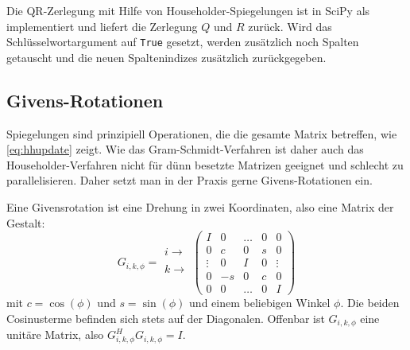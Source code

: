 Die QR-Zerlegung mit Hilfe von Householder-Spiegelungen ist in SciPy
als  implementiert und liefert die Zerlegung
$Q$ und $R$ zurück. Wird das Schlüsselwortargument  auf
\texttt{True} gesetzt, werden zusätzlich noch Spalten getauscht und
die neuen Spaltenindizes zusätzlich zurückgegeben.

\subsection{Givens-Rotationen}

Spiegelungen sind prinzipiell Operationen, die die gesamte Matrix
betreffen, wie \eqref{eq:hhupdate} zeigt. Wie das
Gram-Schmidt-Verfahren ist daher auch das Householder-Verfahren nicht
für dünn besetzte Matrizen geeignet und schlecht zu
parallelisieren. Daher setzt man in der Praxis gerne Givens-Rotationen
ein.

Eine Givensrotation ist eine Drehung in zwei Koordinaten, also eine
Matrix der Gestalt:
\begin{equation}
  G_{i,k,\phi} = \begin{matrix}
    \\
    i\rightarrow\\
    \\
    k\rightarrow\\
    \\
  \end{matrix}\begin{pmatrix}
    I      & 0 & \ldots& 0&0\\
    0      & c & 0 & s & 0 \\
    \vdots & 0 & I & 0 & \vdots\\
    0      & -s & 0 & c & 0 \\
    0      & 0 & \ldots& 0 &I
  \end{pmatrix}
\end{equation}
mit $c=\cos(\phi)$ und $s=\sin(\phi)$ und einem beliebigen Winkel
$\phi$. Die beiden Cosinusterme befinden sich stets auf der
Diagonalen. Offenbar ist $G_{i,k,\phi}$ eine unitäre Matrix, also
$G_{i,k,\phi}^HG_{i,k,\phi}=I$.

